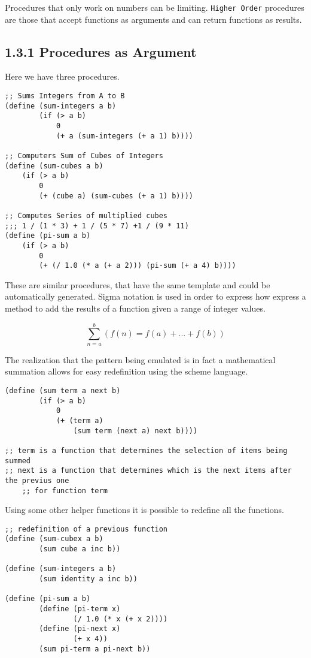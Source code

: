 \documentclass[11pt]{article}
\begin{document}
Procedures that only work on numbers can be limiting. \texttt{Higher Order}
procedures are those that accept functions as arguments and can return
functions as results.

\subsection{1.3.1 Procedures as Argument}
\label{sec:orgd5a7624}
Here we have three procedures.

\begin{verbatim}
;; Sums Integers from A to B
(define (sum-integers a b)
        (if (> a b)
            0
            (+ a (sum-integers (+ a 1) b))))

;; Computers Sum of Cubes of Integers
(define (sum-cubes a b)
    (if (> a b)
        0
        (+ (cube a) (sum-cubes (+ a 1) b))))

;; Computes Series of multiplied cubes
;;; 1 / (1 * 3) + 1 / (5 * 7) +1 / (9 * 11)
(define (pi-sum a b)
    (if (> a b)
        0
        (+ (/ 1.0 (* a (+ a 2))) (pi-sum (+ a 4) b))))
\end{verbatim}

These are similar procedures, that have the same template and could be
automatically generated. Sigma notation is used in order to express how
express a method to add the results of a function given a range of
integer values.

\begin{equation}
\sum_{n=a}^{b}(f(n) = f(a)+...+f(b))
\end{equation}

The realization that the pattern being emulated is in fact a
mathematical summation allows for easy redefinition using the scheme
language.

\begin{verbatim}
(define (sum term a next b)
        (if (> a b)
            0
            (+ (term a)
                (sum term (next a) next b))))

;; term is a function that determines the selection of items being summed
;; next is a function that determines which is the next items after the previus one
    ;; for function term
\end{verbatim}

Using some other helper functions it is possible to redefine all the
functions.

\begin{verbatim}
;; redefinition of a previous function
(define (sum-cubex a b)
        (sum cube a inc b))

(define (sum-integers a b)
        (sum identity a inc b))

(define (pi-sum a b)
        (define (pi-term x)
                (/ 1.0 (* x (+ x 2))))
        (define (pi-next x)
                (+ x 4))
        (sum pi-term a pi-next b))
\end{verbatim}
\end{document}
